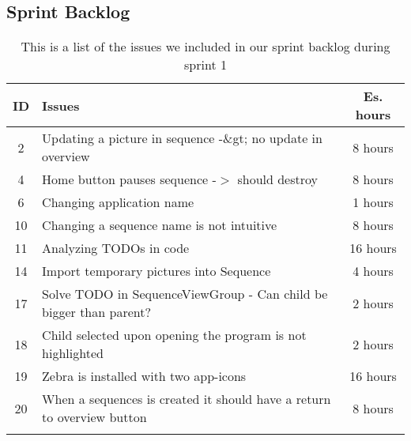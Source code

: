 \subsection{Sprint Backlog}\label{subsec:spr1_sprblog}
\begin{longtable} { | c | p{12cm} | c | } 
\hline
	ID 	&	Issues	&		 Es. hours \\\hline
	2	& 	Updating a picture in sequence -\&gt; no update in overview	&	8 hours	\\\hline
	4	& 	Home button pauses sequence -$>$ should destroy	&	8 hours	\\\hline
	6	& 	Changing application name	&	1 hours	\\\hline
	10	& 	Changing a sequence name is not intuitive	&	8 hours	\\\hline
	11	& 	Analyzing TODOs in code	&	16 hours	\\\hline
	14	& 	Import temporary pictures into Sequence	&	4 hours	\\\hline
	17	& 	Solve TODO in SequenceViewGroup - Can child be bigger than parent?	&	2 hours	\\\hline
	18	& 	Child selected upon opening the program is not highlighted	&	2 hours	\\\hline
	19	& 	Zebra is installed with two app-icons	&	16 hours	\\\hline
	20	& 	When a sequences is created it should have a return to overview button	&	8 hours	\\\hline
\caption{This is a list of the issues we included in our sprint backlog during sprint 1}
\label{tab:spr1_prodblog}
\end{longtable}